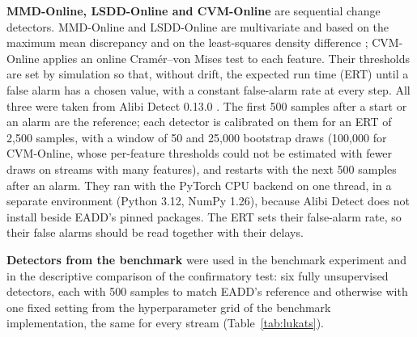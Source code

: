 \textbf{MMD-Online, LSDD-Online and CVM-Online} are sequential change detectors. MMD-Online and LSDD-Online \citep{CobbSequential2022} are multivariate and based on the maximum mean discrepancy \citep{Gretton2012} and on the least-squares density difference \citep{Sugiyama2013LSDD}; CVM-Online applies an online Cram\'{e}r--von Mises test \citep{RossAdams2012} to each feature. Their thresholds are set by simulation so that, without drift, the expected run time (ERT) until a false alarm has a chosen value, with a constant false-alarm rate at every step. All three were taken from Alibi Detect 0.13.0 \citep{AlibiDetect}. The first 500 samples after a start or an alarm are the reference; each detector is calibrated on them for an ERT of 2,500 samples, with a window of 50 and 25,000 bootstrap draws (100,000 for CVM-Online, whose per-feature thresholds could not be estimated with fewer draws on streams with many features), and restarts with the next 500 samples after an alarm. They ran with the PyTorch CPU backend on one thread, in a separate environment (Python 3.12, NumPy 1.26), because Alibi Detect does not install beside EADD's pinned packages. The ERT sets their false-alarm rate, so their false alarms should be read together with their delays.

\textbf{Detectors from the \citet{Lukats2024} benchmark} were used in the benchmark experiment and in the descriptive comparison of the confirmatory test: six fully unsupervised detectors, each with 500 samples to match EADD's reference and otherwise with one fixed setting from the hyperparameter grid of the benchmark implementation, the same for every stream (Table~\ref{tab:lukats}).

